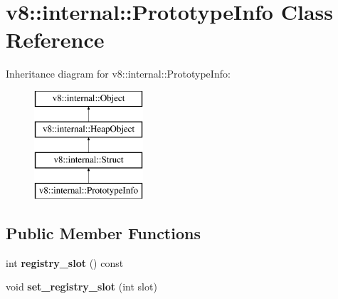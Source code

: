 \hypertarget{classv8_1_1internal_1_1_prototype_info}{}\section{v8\+:\+:internal\+:\+:Prototype\+Info Class Reference}
\label{classv8_1_1internal_1_1_prototype_info}
Inheritance diagram for v8\+:\+:internal\+:\+:Prototype\+Info\+:\begin{figure}[H]
\begin{center}
\leavevmode
\includegraphics[height=4.000000cm]{classv8_1_1internal_1_1_prototype_info}
\end{center}
\end{figure}
\subsection*{Public Member Functions}
\begin{DoxyCompactItemize}
\item 
int {\bfseries registry\+\_\+slot} () const \hypertarget{classv8_1_1internal_1_1_prototype_info_a6f0b323583c0764de4dd4d54e549b922}{}\label{classv8_1_1internal_1_1_prototype_info_a6f0b323583c0764de4dd4d54e549b922}

\item 
void {\bfseries set\+\_\+registry\+\_\+slot} (int slot)\hypertarget{classv8_1_1internal_1_1_prototype_info_a7274493679b5e347e8a6c3fe8204389f}{}\label{classv8_1_1internal_1_1_prototype_info_a7274493679b5e347e8a6c3fe8204389f}

\end{DoxyCompactItemize}
